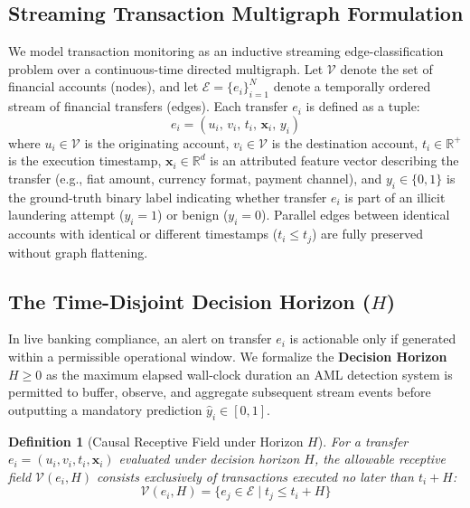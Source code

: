 \documentclass[pdflatex,sn-mathphys,Numbered]{sn-jnl}
\theoremstyle{thmstyleone}
\theoremstyle{thmstyletwo}
\theoremstyle{thmstylethree}
\newtheorem{definition}{Definition}
\begin{document}
\subsection{Streaming Transaction Multigraph Formulation}
We model transaction monitoring as an inductive streaming edge-classification problem over a continuous-time directed multigraph. Let $\mathcal{V}$ denote the set of financial accounts (nodes), and let $\mathcal{E}=\{e_i\}_{i=1}^N$ denote a temporally ordered stream of financial transfers (edges). Each transfer $e_i$ is defined as a tuple:
\begin{equation}
e_i = (u_i, \, v_i, \, t_i, \, \mathbf{x}_i, \, y_i)
\end{equation}
where $u_i \in \mathcal{V}$ is the originating account, $v_i \in \mathcal{V}$ is the destination account, $t_i \in \mathbb{R}^+$ is the execution timestamp, $\mathbf{x}_i \in \mathbb{R}^d$ is an attributed feature vector describing the transfer (e.g., fiat amount, currency format, payment channel), and $y_i \in \{0, 1\}$ is the ground-truth binary label indicating whether transfer $e_i$ is part of an illicit laundering attempt ($y_i=1$) or benign ($y_i=0$). Parallel edges between identical accounts with identical or different timestamps ($t_i \le t_j$) are fully preserved without graph flattening.

\subsection{The Time-Disjoint Decision Horizon ($H$)}
In live banking compliance, an alert on transfer $e_i$ is actionable only if generated within a permissible operational window. We formalize the \textbf{Decision Horizon $H \ge 0$} as the maximum elapsed wall-clock duration an AML detection system is permitted to buffer, observe, and aggregate subsequent stream events before outputting a mandatory prediction $\hat{y}_i \in [0, 1]$. 

\begin{definition}[Causal Receptive Field under Horizon $H$]
For a transfer $e_i = (u_i, v_i, t_i, \mathbf{x}_i)$ evaluated under decision horizon $H$, the allowable receptive field $\mathcal{V}(e_i, H)$ consists exclusively of transactions executed no later than $t_i + H$:
\begin{equation}
\mathcal{V}(e_i, H) = \{e_j \in \mathcal{E} \mid t_j \le t_i + H\}
\end{equation}
\end{definition}
\end{document}
